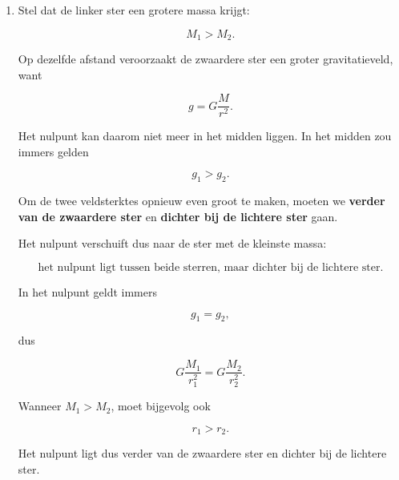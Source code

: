 \documentclass{ximera}
\begin{document}
\begin{oefening}[Nulveld]{\oefU\ESS}
\begin{oplossing}
\begin{enumerate}
      \[
      g_1=g_2.
      \]
      
      Hun zin is echter tegengesteld. Daarom heffen ze elkaar vectorieel op:
      
      \[
      \vec g_{\mathrm{res}}
      =
      \vec g_1+\vec g_2
      =
      \vec 0.
      \]
      
      Dus:
      
      \[
      \boxed{
      \vec g_{\mathrm{res}}=\vec 0
      \quad\text{betekent niet dat}\quad
      \vec g_1=\vec g_2=\vec 0.
      }
      \]
      
      
      \item
      Stel dat de linker ster een grotere massa krijgt:
      
      \[
      M_1>M_2.
      \]
      
      Op dezelfde afstand veroorzaakt de zwaardere ster een groter
      gravitatieveld, want
      
      \[
      g=G\frac{M}{r^2}.
      \]
      
      Het nulpunt kan daarom niet meer in het midden liggen. In het midden
      zou immers gelden
      
      \[
      g_1>g_2.
      \]
      
      Om de twee veldsterktes opnieuw even groot te maken, moeten we
      \textbf{verder van de zwaardere ster} en
      \textbf{dichter bij de lichtere ster} gaan.
      
      Het nulpunt verschuift dus naar de ster met de kleinste massa:
      
      \[
      \boxed{
      \text{het nulpunt ligt tussen beide sterren,
      maar dichter bij de lichtere ster.}
      }
      \]
      
      In het nulpunt geldt immers
      
      \[
      g_1=g_2,
      \]
      
      dus
      
      \[
      G\frac{M_1}{r_1^2}
      =
      G\frac{M_2}{r_2^2}.
      \]
      
      Wanneer $M_1>M_2$, moet bijgevolg ook
      
      \[
      r_1>r_2.
      \]
      
      Het nulpunt ligt dus verder van de zwaardere ster en dichter bij de
      lichtere ster.
      
      \end{enumerate}
      
      \end{oplossing}

\end{oefening}
\end{document}
